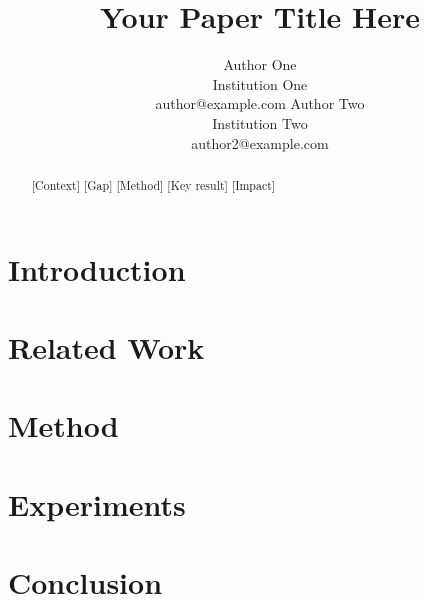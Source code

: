 \documentclass{article}
\title{Your Paper Title Here}
\author{Author One \\ Institution One \\ author@example.com \And
  Author Two \\ Institution Two \\ author2@example.com}
\begin{document}
\maketitle

\begin{abstract}
  [Context] [Gap] [Method] [Key result] [Impact]
\end{abstract}

\section{Introduction}
\section{Related Work}
\section{Method}
\section{Experiments}
\section{Conclusion}



\end{document}
